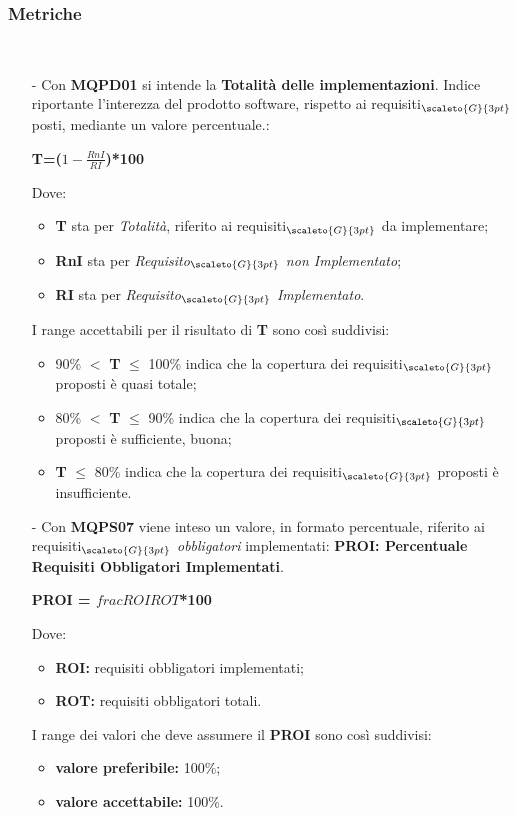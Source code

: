 \subsubsection{Metriche}\label{ProcessiPrimariProspettiveAnalisiDeiRequisitiMetriche}\mbox{}\\
\begin{itemize}
	\item[-] Con \textbf{MQPD01} si intende la \textbf{Totalità delle implementazioni}. Indice riportante l'interezza del prodotto software, rispetto ai requisiti$_{\scaleto{G}{3pt}}$ posti, mediante un valore percentuale.:

\begin{center}
	\textbf{T=($1-\frac{RnI}{RI}$)*100}
\end{center}
Dove:
\begin{itemize}
	\item \textbf{T} sta per \textit{Totalità}, riferito ai requisiti$_{\scaleto{G}{3pt}}$ da implementare;
	\item \textbf{RnI} sta per \textit{Requisito$_{\scaleto{G}{3pt}}$ non Implementato};
	\item \textbf{RI} sta per \textit{Requisito$_{\scaleto{G}{3pt}}$ Implementato}.
\end{itemize}
I range accettabili per il risultato di \textbf{T} sono così suddivisi:
\begin{itemize}
	\item 90\% $<$ \textbf{T} $\leq$ 100\% indica che la copertura dei requisiti$_{\scaleto{G}{3pt}}$ proposti è quasi totale;
	\item 80\% $<$ \textbf{T} $\leq$ 90\% indica che la copertura dei requisiti$_{\scaleto{G}{3pt}}$ proposti è sufficiente, buona;
	\item \textbf{T} $\leq$ 80\% indica che la copertura dei requisiti$_{\scaleto{G}{3pt}}$ proposti è insufficiente.
\end{itemize}

\item[-] Con \textbf{MQPS07} viene inteso un valore, in formato percentuale, riferito ai requisiti$_{\scaleto{G}{3pt}}$ \textit{obbligatori} implementati: \textbf{PROI: Percentuale Requisiti Obbligatori Implementati}.
\begin{center}
	\textbf{PROI = $frac{ROI}{ROT}$*100}
\end{center}
Dove:
\begin{itemize}
	\item \textbf{ROI:} requisiti obbligatori implementati;
	\item \textbf{ROT:} requisiti obbligatori totali.
\end{itemize}
I range dei valori che deve assumere il \textbf{PROI} sono così suddivisi:
\begin{itemize}
\item \textbf{valore preferibile:} 100\%;
\item \textbf{valore accettabile:} 100\%.
\end{itemize}

\end{itemize}


